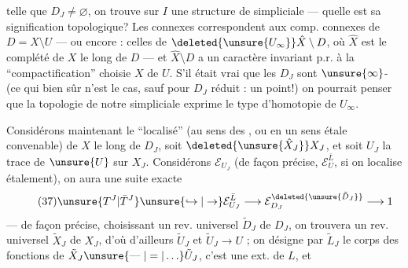 
telle que $D_J\ne\varnothing$,  on trouve sur $I$ une structure de   simpliciale --- quelle est sa signification topologique? Les  connexes correspondent aux comp. connexes de $D=X\setminus U$ --- ou encore : celles de $\deleted{\unsure{U_\infty}}\hat X\setminus D$, où $\hat X$ est le  complété de $X$ le long de $D$ --- et $\hat X\setminus D$ a un caractère invariant p.r. à la ``compactification'' choisie $X$ de $U$. S'il était vrai que les $D_J$  sont $\unsure{\infty}$- (ce qui bien sûr n'est \uline{} le cas, sauf pour $D_J$ réduit : un point!) on pourrait penser que la topologie de notre   simpliciale exprime le type d'homotopie de $U_\infty$.

Considérons maintenant le ``localisé''  (au sens des , ou en un sens étale convenable) de $X$ le long de $D_J$, soit $\deleted{\unsure{\hat X_J}}X_J$, et soit $U_J$  la trace de $\unsure{U}$ sur $X_J$. Considérons $\mathcal E_{U_J}$ (de façon précise, $\mathcal E_U^{\bar L}$, si on localise  étalement), on aura une suite exacte
\[
\tag{37}
\unsure{T^J|\bar T^J}\unsure{\hookrightarrow|\to}\mathcal E_{U_J}^{\bar L}\longrightarrow\mathcal E_{D_J}^{\deleted{\unsure{\tilde D_J}}}\longrightarrow1
\]
--- de façon précise, choisissant un rev. universel $\tilde D_J$ de $D_J$, on trouvera un rev. universel  $\tilde X_J$ de $X_J$, d'où d'ailleurs $\tilde U_J$ et $\tilde U_J\longrightarrow U$ ;  on désigne par $\tilde L_J$ le corps des fonctions de $\tilde X_J\unsure{\mathrel{\text{---}}|=|\ldots}\tilde U_J$, c'est une ext.  de $L$, et





